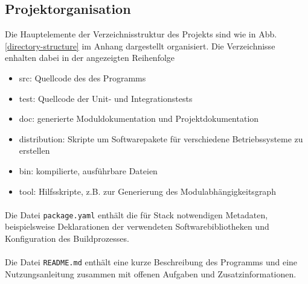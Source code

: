 \subsection{Projektorganisation}
Die Hauptelemente der Verzeichnisstruktur des Projekts sind wie in Abb. \ref{directory-structure}
im Anhang dargestellt organisiert. Die Verzeichnisse enhalten dabei in der angezeigten Reihenfolge

\begin{itemize}
    \item src: Quellcode des des Programms
    \item test: Quellcode der Unit- und Integrationstests
    \item doc: generierte Moduldokumentation und Projektdokumentation
    \item distribution: Skripte um Softwarepakete für verschiedene Betriebssysteme zu erstellen
    \item bin: kompilierte, ausführbare Dateien
    \item tool: Hilfsskripte, z.B. zur Generierung des Modulabhängigkeitsgraph
\end{itemize}

\paragraph{}
Die Datei \texttt{package.yaml} enthält die für Stack notwendigen Metadaten,
beispielsweise Deklarationen der verwendeten Softwarebibliotheken und Konfiguration
des Buildprozesses.

\paragraph{}
Die Datei \texttt{README.md} enthält eine kurze Beschreibung des
Programms und eine Nutzungsanleitung zusammen mit offenen Aufgaben und
Zusatzinformationen.